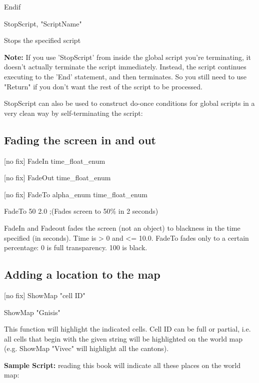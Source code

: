 Endif

StopScript, "ScriptName"

Stops the specified script

\textbf{Note:} If you use 'StopScript' from inside the global script
you're terminating, it doesn't actually terminate the script
immediately. Instead, the script continues executing to the 'End'
statement, and then terminates. So you still need to use "Return" if you
don't want the rest of the script to be processed.

StopScript can also be used to construct do-once conditions for global
scripts in a very clean way by self-terminating the script:



\hypertarget{fading-the-screen-in-and-out}{%
\subsection{Fading the screen in and
out}\label{fading-the-screen-in-and-out}}

{[}no fix{]} FadeIn time\_float\_enum

{[}no fix{]} FadeOut time\_float\_enum

{[}no fix{]} FadeTo alpha\_enum time\_float\_enum

FadeTo 50 2.0 ;(Fades screen to 50\% in 2 seconds)

FadeIn and Fadeout fades the screen (not an object) to blackness in the
time specified (in seconds). Time is > 0 and <=
10.0. FadeTo fades only to a certain percentage: 0 is full transparency.
100 is black.

\hypertarget{adding-a-location-to-the-map}{%
\subsection{Adding a location to the
map}\label{adding-a-location-to-the-map}}

{[}no fix{]} ShowMap "cell ID"

ShowMap "Gnisis"

This function will highlight the indicated cells. Cell ID can be full or
partial, i.e. all cells that begin with the given string will be
highlighted on the world map (e.g. ShowMap "Vivec" will highlight all
the cantons).

\textbf{Sample Script:} reading this book will indicate all these places
on the world map:



